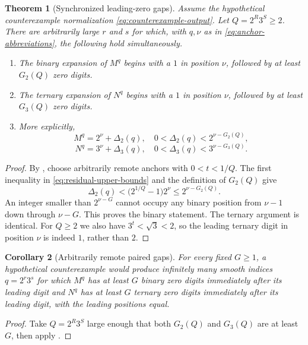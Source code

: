 \documentclass[11pt]{article}
\newtheorem{theorem}{Theorem}[section]
\newtheorem{corollary}[theorem]{Corollary}
\theoremstyle{definition}
\theoremstyle{remark}
\begin{document}
\begin{theorem}[Synchronized leading-zero gaps]\label{thm:leading-zero-gaps}
Assume the hypothetical counterexample normalization
\eqref{eq:counterexample-output}.  Let $Q=2^R3^S\ge2$.  There are arbitrarily large
$r$ and $s$ for which, with $q,\nu$ as in
\eqref{eq:anchor-abbreviations}, the following hold simultaneously.
\begin{enumerate}
\item The binary expansion of $M^q$ begins with a $1$ in position $\nu$, followed
by at least $G_2(Q)$ zero digits.
\item The ternary expansion of $N^q$ begins with a $1$ in position $\nu$, followed
by at least $G_3(Q)$ zero digits.
\item More explicitly,
\begin{equation}\label{eq:gap-expansions}
 M^q=2^\nu+\Delta_2(q),\quad 0<\Delta_2(q)<2^{\nu-G_2(Q)},
\end{equation}
\begin{equation}\label{eq:gap-expansions-three}
 N^q=3^\nu+\Delta_3(q),\quad 0<\Delta_3(q)<3^{\nu-G_3(Q)}.
\end{equation}
\end{enumerate}
\end{theorem}

\begin{proof}
By , choose arbitrarily remote anchors with
$0<t<1/Q$.  The first inequality in \eqref{eq:residual-upper-bounds} and the
definition of $G_2(Q)$ give
\[
 \Delta_2(q)<\bigl(2^{1/Q}-1\bigr)2^\nu\le 2^{\nu-G_2(Q)}.
\]
An integer smaller than $2^{\nu-G}$ cannot occupy any binary position from
$\nu-1$ down through $\nu-G$.  This proves the binary statement.  The ternary
argument is identical.  For $Q\ge2$ we also have $3^t<\sqrt3<2$, so the leading
ternary digit in position $\nu$ is indeed $1$, rather than $2$.
\end{proof}

\begin{corollary}[Arbitrarily remote paired gaps]
For every fixed $G\ge1$, a hypothetical counterexample would produce infinitely
many smooth indices $q=2^r3^s$ for which $M^q$ has at least $G$ binary zero digits
immediately after its leading digit and $N^q$ has at least $G$ ternary zero digits
immediately after its leading digit, with the leading positions equal.
\end{corollary}

\begin{proof}
Take $Q=2^R3^S$ large enough that both $G_2(Q)$ and $G_3(Q)$ are at least $G$, then
apply .
\end{proof}
\end{document}
